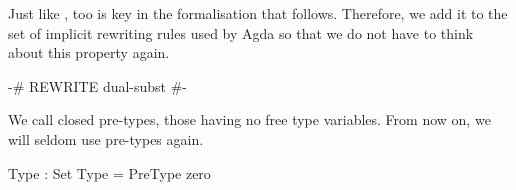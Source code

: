 Just like ,  too is key in the
formalisation that follows. Therefore, we add it to the set of implicit
rewriting rules used by Agda so that we do not have to think about this property
again.

\begin{code}
{-# REWRITE dual-subst #-}
\end{code}

We call  closed pre-types, those having no free type
variables. From now on, we will seldom use pre-types again.

\begin{code}
Type : Set
Type = PreType zero
\end{code}
